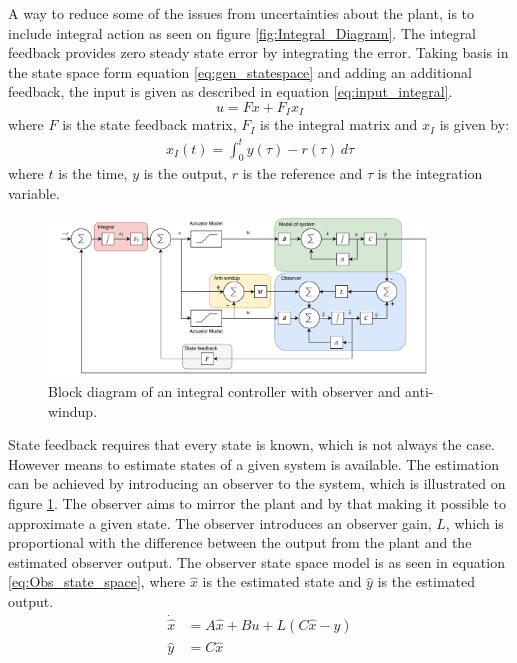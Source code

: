 \documentclass[../../main.tex]{subfiles}
\begin{document}
A way to reduce some of the issues from uncertainties about the plant, is to include integral action as seen on figure \ref{fig:Integral_Diagram}. The integral feedback provides zero steady state error by integrating the error. Taking basis in the state space form equation \ref{eq:gen_statespace} and adding an additional feedback, the input is given as described in equation \ref{eq:input_integral}.
\begin{equation}\label{eq:input_integral}
    u=Fx+F_Ix_I
\end{equation}
where $F$ is the state feedback matrix, $F_I$ is the integral matrix and $x_I$ is given by:
\begin{equation}
    \begin{split}
        x_I(t)=\int_0^t y(\tau)-r(\tau)\,d\tau
    \end{split}
\end{equation}
where $t$ is the time, $y$ is the output, $r$ is the reference and $\tau$ is the integration variable.

\begin{figure}
    \centering
    \includegraphics[width=0.9\textwidth]{Sections/Miscellaneous/Images/Anti_Windup_Integral_Observer.pdf}
    \caption{Block diagram of an integral controller with observer and anti-windup.}
    \label{fig:Integral_Observer_Diagram}
\end{figure}

State feedback requires that every state is known, which is not always the case. However means to estimate states of a given system is available. The estimation can be achieved by introducing an observer to the system, which is illustrated on figure \ref{fig:Integral_Observer_Diagram}. The observer aims to mirror the plant and by that making it possible to approximate a given state.
The observer introduces an observer gain, $L$, which is proportional with the difference between the output from the plant and the estimated observer output. The observer state space model is as seen in equation \ref{eq:Obs_state_space}, where $\hat{x}$ is the estimated state and $\hat{y}$ is the estimated output.
\begin{equation}\label{eq:Obs_state_space}
    \begin{split}
        \Dot{\hat{x}}&=A\hat{x}+Bu+L(C\hat{x}-y)\\
        \hat{y}&=C\hat{x}
    \end{split}
\end{equation}
\end{document}
